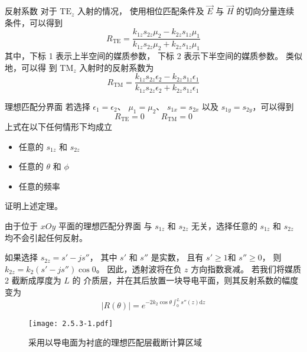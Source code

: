 \begin{theorem}{反射系数}
    对于 $\text{TE}_z$ 入射的情况，
    使用相位匹配条件及 $\vec{E}$ 与 $\vec{H}$ 的切向分量连续条件，可以得到
    \begin{equation}
        R_{\text{TE}}
        =\frac{k_{1z}s_{2z}\mu_2-k_{2z}s_{1z}\mu_1}
        {k_{1z}s_{2z}\mu_2+k_{2z}s_{1z}\mu_1}
    \end{equation}
    其中，下标 1 表示上半空间的媒质参数，
    下标 2 表示下半空间的媒质参数。
    类似地，可以得
    到 $\text{TM}_z$ 入射时的反射系数为
    \begin{equation}
        R_{\text{TM}}
        =\frac{k_{1z}s_{2z}\epsilon_2-k_{2z}s_{1z}\epsilon_1}
        {k_{1z}s_{2z}\epsilon_2+k_{2z}s_{1z}\epsilon_1}
    \end{equation}
\end{theorem}

\begin{theorem}{理想匹配分界面}
    若选择 $\epsilon_1=\epsilon_2$、
    $\mu_1=\mu_2$、
    $s_{1x}=s_{2x}$ 以及 $s_{1y}=s_{2y}$，可以得到
    \begin{equation}
        R_{\text{TE}}=0
        \qquad
        R_{\text{TM}}=0
    \end{equation}
    上式在以下任何情形下均成立
    \begin{itemize}
        \item 任意的 $s_{1z}$ 和 $s_{2z}$
        \item 任意的 $\theta$ 和 $\phi$
        \item 任意的频率
    \end{itemize}
\end{theorem}

\begin{exercise}
    证明上述定理。
\end{exercise}

\par 由于位于 $xOy$ 平面的理想匹配分界面
与 $s_{1z}$ 和 $s_{2z}$ 无关，选择任意的 $s_{1z}$ 
和 $s_{2z}$ 均不会引起任何反射。
\par 如果选择 $s_{2z}=s'-js''$，
其中 $s'$ 和 $s''$ 是实数，
且有 $s'\geq1$和 $s''\geq0$，
则 $k_{2z}=k_2(s'-js'')\cos 0$。
因此，透射波将在负 $z$ 方向指数衰减。
若我们将媒质 2 截断成厚度为 $L$ 的
介质层，并在其后放置一块导电平面，则其反射系数的幅度变为
\begin{equation}
    |R(\theta)|=e^{-2k_2\cos \theta \int_{0}^{L}s''(z) \text{d}z}
\end{equation}

\begin{figure}[!htbp]
    \centering
    \texttt{[image: 2.5.3-1.pdf]}
    \caption{采用以导电面为衬底的理想匹配层截断计算区域}
\end{figure}


